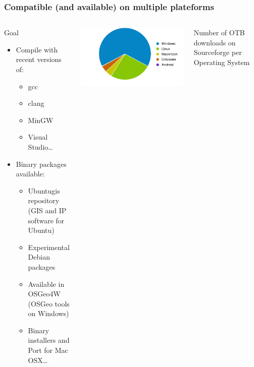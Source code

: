 \documentclass[8pt]{beamer}
\begin{document}
\begin{frame}
\frametitle{Compatible (and available) on multiple plateforms}
\begin{columns}
\begin{block}{Goal}
\begin{itemize}
\item Compile with recent versions of:
\begin{itemize}
\item gcc
\item clang
\item MinGW
\item Visual Studio\ldots
\end{itemize}
\item Binary packages available:
\begin{itemize}
\item Ubuntugis repository (GIS and IP software for Ubuntu)
\item Experimental Debian packages 
\item Available in  OSGeo4W (OSGeo tools on Windows)
\item Binary installers and Port for Mac OSX\ldots
\end{itemize}
\end{itemize}
\end{block}
\includegraphics[width=\textwidth]{images/OTB4_download_sourceforge_os_crop.png}
\begin{center}
\tiny{Number of OTB downloads on Sourceforge per Operating System}
\end{center}
\end{columns}
\end{frame}
\end{document}
